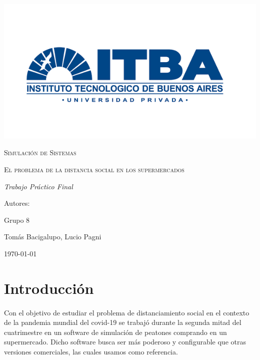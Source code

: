 \documentclass{article}
\author{Tomás Bacigalupo , Lucio Pagni}
\date{\today}
\author{Tomás Bacigalupo y Lucio Pagni}
\date{18/07/2020} %
\begin{document}
\begin{titlepage}
\centering
{\includegraphics[width=1\textwidth]{./images/logoitba.png}\par}
\vspace{1cm}
{\scshape\Large Simulación de Sistemas \par}
\vspace{3cm}
{\scshape\Huge El problema de la distancia social en los supermercados \par}
\vspace{3cm}
{\itshape\Large Trabajo Práctico Final \par}
\vfill
{\Large Autores: \par}
{\Large Grupo 8\par}
{\Large Tomás Bacigalupo, Lucio Pagni\par}
\vfill
{\Large \today \par}
\end{titlepage}
\clearpage

\listoffigures   %
\clearpage
\listoftables %
 \clearpage

\tableofcontents
\clearpage

\section{Introducción}

\paragraph{}
Con el objetivo de estudiar el problema de distanciamiento social en el contexto de la pandemia mundial del covid-19 se trabajó durante la segunda mitad del cuatrimestre en un software de simulación de peatones comprando en un supermercado. Dicho software busca ser más poderoso y configurable que otras versiones comerciales, las cuales usamos como referencia.
\end{document}
